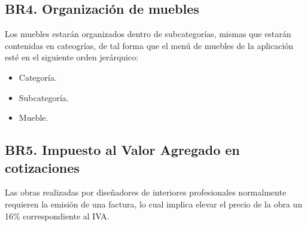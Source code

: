 \subsection{BR4. Organización de muebles}
Los muebles estarán organizados dentro de subcategorías, mismas que estarán contenidas en cateogrías, de tal forma que el menú de muebles de la aplicación esté en el siguiente orden jerárquico:
\begin{itemize}
	\item Categoría.
	\item Subcategoría.
	\item Mueble.
\end{itemize}
\subsection{BR5. Impuesto al Valor Agregado en cotizaciones}
Las obras realizadas por diseñadores de interiores profesionales normalmente requieren la emisión de una factura, lo cual implica elevar el precio de la obra un 16\% correspondiente al IVA.